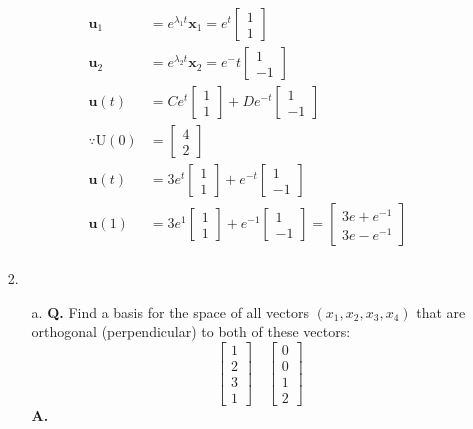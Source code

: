 \documentclass[main.tex]{subfiles}
\begin{document}
\begin{enumerate}
$$
\begin{aligned}
\bm{u}_1 & = e^{\lambda_1 t}\bm{x}_1 = e^t \left[\begin{array}{l}
1\\
1
\end{array}\right] \\
\bm{u}_2 & = e^{\lambda_2 t}\bm{x}_2 = e^-t \left[\begin{array}{l}
1\\
-1
\end{array}\right] \\
\bm{u}(t) & = C e^t \left[\begin{array}{l} 1 \\ 1 \end{array}\right] 
+ D e^{-t} \left[\begin{array}{l} 1 \\ -1 \end{array}\right] \\
\because \mathrm{U}(0) & =\left[\begin{array}{l}
4 \\
2
\end{array}\right] \\
\bm{u}(t) & = 3 e^t \left[\begin{array}{l} 1 \\ 1 \end{array}\right] 
+ e^{-t} \left[\begin{array}{l} 1 \\ -1 \end{array}\right]\\
\bm{u}(1) & = 3 e^1 \left[\begin{array}{l} 1 \\ 1 \end{array}\right] 
+ e^{-1} \left[\begin{array}{l} 1 \\ -1 \end{array}\right] 
= \left[\begin{array}{l} 3 e + e^{-1} \\ 3 e - e^{-1} \end{array}\right] \\
\end{aligned}
$$


\item[2.] 
    \begin{enumerate}
    \item [a.] \textbf{Q.} Find a basis for the space of all vectors $\left(x_{1}, x_{2}, x_{3}, x_{4}\right)$ that are orthogonal (perpendicular) to both of these vectors:
    $$
    \left[\begin{array}{l}
    1 \\
    2 \\
    3 \\
    1
    \end{array}\right] \quad\left[\begin{array}{l}
    0 \\
    0 \\
    1 \\
    2
    \end{array}\right]
    $$
    \textbf{A.}


\end{enumerate}
\end{enumerate}
\end{document}
